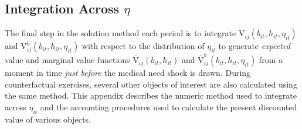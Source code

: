 \documentclass[12pt,pdftex,letterpaper]{article}
\newcommand{\Type}{\iota}
\newcommand{\Health}{h}
\newcommand{\Value}{\text{V}}
\newcommand{\Bank}{b}
\newcommand{\Age}{j}
\newcommand{\MedShk}{\eta}
\begin{document}
\subsection{Integration Across $\MedShk$}
\label{app:Integration}

The final step in the solution method each period is to integrate $\Value_{\Type \Age}(\Bank_{it},\Health_{it},\MedShk_{it})$ and $\Value^\Bank_{\Type \Age}(\Bank_{it},\Health_{it},\MedShk_{it})$ with respect to the distribution of $\MedShk_{it}$ to generate \textit{expected} value and marginal value functions $\overline{\Value}_{\Type \Age}(\Bank_{it},\Health_{it})$ and $\overline{\Value}^\Bank_{\Type \Age}(\Bank_{it},\Health_{it},\MedShk_{it})$ from a moment in time \textit{just before} the medical need shock is drawn.  During counterfactual exercises, several other objects of interest are also calculated using the same method.  This appendix describes the numeric method used to integrate across $\MedShk_{it}$ and the accounting procedures used to calculate the present discounted value of various objects.
\end{document}

